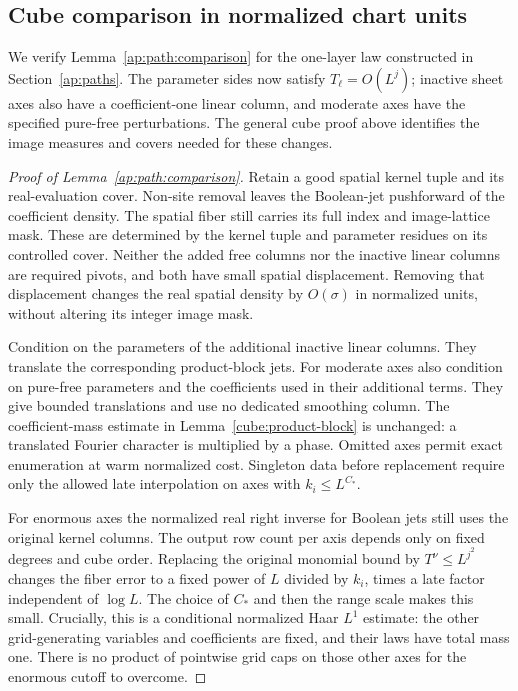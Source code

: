 \subsection{Cube comparison in normalized chart units}
\label{ap:path:comparison-proof}

We verify Lemma~\ref{ap:path:comparison} for the one-layer law
constructed in Section~\ref{ap:paths}. The parameter sides now
satisfy $T_\ell=O(L^j)$; inactive sheet axes also have a
coefficient-one linear column, and moderate axes have the
specified pure-free perturbations. The general cube proof above
identifies the image measures and covers needed for these changes.

\begin{proof}[Proof of Lemma~\ref{ap:path:comparison}]  Retain a good spatial kernel
tuple and its real-evaluation cover.  Non-site removal leaves the
Boolean-jet pushforward of the coefficient density.  The spatial
fiber still carries its full index and image-lattice mask.  These
are determined by the kernel tuple and parameter residues on its
controlled cover.  Neither the added free columns nor the inactive
linear columns are required pivots, and both have small spatial
displacement.  Removing that displacement changes the real spatial
density by $O(\sigma)$ in normalized units, without altering its
integer image mask.

Condition on the parameters of the additional inactive linear
columns.  They translate the corresponding product-block jets.
For moderate axes also condition on pure-free parameters and the
coefficients used in their additional terms.  They give bounded
translations and use no dedicated smoothing column.  The
coefficient-mass estimate in Lemma~\ref{cube:product-block} is
unchanged: a translated Fourier character is multiplied by a
phase.  Omitted axes permit exact enumeration at warm normalized
cost.  Singleton data before replacement require only the allowed
late interpolation on axes with $k_i\le L^{C_*}$.

For enormous axes the normalized real right inverse for Boolean
jets still uses the original kernel columns.  The output row count
per axis depends only on fixed degrees and cube order.  Replacing
the original monomial bound by $T^\nu\le L^{j^2}$ changes the
fiber error to a fixed power of $L$ divided by $k_i$, times a late
factor independent of $\log L$.  The choice of $C_*$ and then the
range scale makes this small.  Crucially, this is a conditional
normalized Haar $L^1$ estimate: the other grid-generating variables
and coefficients are fixed, and their laws have total mass one.
There is no product of pointwise grid caps on those other axes for
the enormous cutoff to overcome.


\end{proof}
